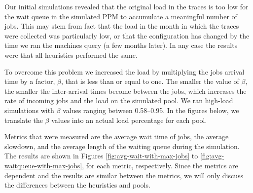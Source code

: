 Our initial simulations revealed that
the original load in the traces is too low for the wait queue in the
simulated PPM to accumulate a meaningful number of jobs.
This may stem from fact that the load in the month in which the traces
were collected was particularly low, or that the configuration
has changed by the time we ran the machines query (a few months later). 
In any case the results were that all heuristics performed the same. 

To overcome this problem we increased the load by multiplying the jobs
arrival time by a factor, $\beta$, that is less than or equal to one.
The smaller the value of $\beta$, the smaller the inter-arrival times
become between the jobs, which increases the rate of incoming jobs and
the load on the simulated pool. 
We ran high-load simulations with $\beta$ 
values ranging between 0.58--0.95. In the figures below, we translate the
$\beta$ values into an actual load percentage for each pool.

Metrics that were measured are the average wait time of jobs, the
average slowdown, and the average length of the waiting queue during the
simulation.
The results are shown in Figures \ref{fig:avg-wait-with-max-jobs} to
\ref{fig:avg-waitqueue-with-max-jobs}, for each metric, respectively.
Since the metrics are dependent and the results are similar between the metrics, 
we will only discuss the differences between the heuristics and pools.




